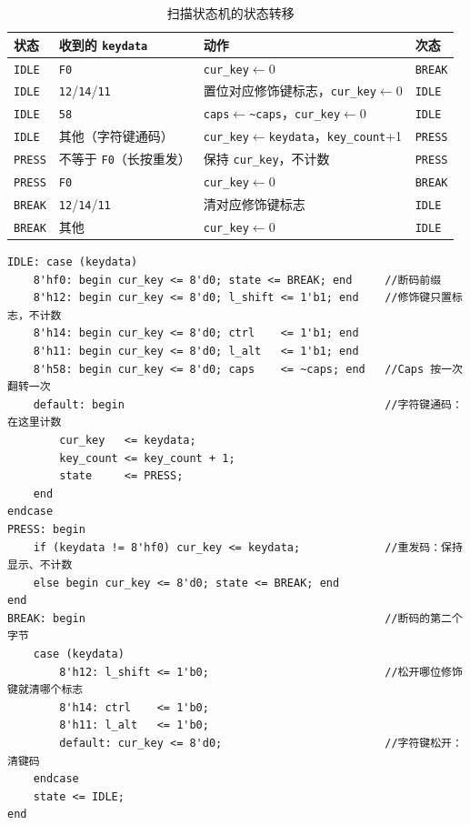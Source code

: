 \documentclass[12pt, a4paper]{ctexart}
\begin{document}
\begin{table}[htbp]
    \centering
    \caption{扫描状态机的状态转移}
    \label{tab:state}
    \begin{tabular}{llll}
        \hline
        状态 & 收到的 \texttt{keydata} & 动作 & 次态 \\
        \hline
        \texttt{IDLE} & \texttt{F0} & \texttt{cur\_key}$\leftarrow$0 & \texttt{BREAK} \\
        \texttt{IDLE} & \texttt{12}/\texttt{14}/\texttt{11} & 置位对应修饰键标志，\texttt{cur\_key}$\leftarrow$0 & \texttt{IDLE} \\
        \texttt{IDLE} & \texttt{58} & \texttt{caps}$\leftarrow$\texttt{\textasciitilde caps}，\texttt{cur\_key}$\leftarrow$0 & \texttt{IDLE} \\
        \texttt{IDLE} & 其他（字符键通码） & \texttt{cur\_key}$\leftarrow$\texttt{keydata}，\texttt{key\_count}+1 & \texttt{PRESS} \\
        \texttt{PRESS} & 不等于 \texttt{F0}（长按重发） & 保持 \texttt{cur\_key}，不计数 & \texttt{PRESS} \\
        \texttt{PRESS} & \texttt{F0} & \texttt{cur\_key}$\leftarrow$0 & \texttt{BREAK} \\
        \texttt{BREAK} & \texttt{12}/\texttt{14}/\texttt{11} & 清对应修饰键标志 & \texttt{IDLE} \\
        \texttt{BREAK} & 其他 & \texttt{cur\_key}$\leftarrow$0 & \texttt{IDLE} \\
        \hline
    \end{tabular}
\end{table}

\begin{lstlisting}
IDLE: case (keydata)
    8'hf0: begin cur_key <= 8'd0; state <= BREAK; end     //断码前缀
    8'h12: begin cur_key <= 8'd0; l_shift <= 1'b1; end    //修饰键只置标志，不计数
    8'h14: begin cur_key <= 8'd0; ctrl    <= 1'b1; end
    8'h11: begin cur_key <= 8'd0; l_alt   <= 1'b1; end
    8'h58: begin cur_key <= 8'd0; caps    <= ~caps; end   //Caps 按一次翻转一次
    default: begin                                        //字符键通码：在这里计数
        cur_key   <= keydata;
        key_count <= key_count + 1;
        state     <= PRESS;
    end
endcase
PRESS: begin
    if (keydata != 8'hf0) cur_key <= keydata;             //重发码：保持显示、不计数
    else begin cur_key <= 8'd0; state <= BREAK; end
end
BREAK: begin                                              //断码的第二个字节
    case (keydata)
        8'h12: l_shift <= 1'b0;                           //松开哪位修饰键就清哪个标志
        8'h14: ctrl    <= 1'b0;
        8'h11: l_alt   <= 1'b0;
        default: cur_key <= 8'd0;                         //字符键松开：清键码
    endcase
    state <= IDLE;
end
\end{lstlisting}
\end{document}
